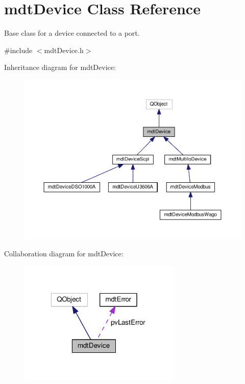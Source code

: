\hypertarget{classmdt_device}{\section{mdt\-Device Class Reference}
\label{classmdt_device}
}


Base class for a device connected to a port.  




{\ttfamily \#include $<$mdt\-Device.\-h$>$}



Inheritance diagram for mdt\-Device\-:\nopagebreak
\begin{figure}[H]
\begin{center}
\leavevmode
\includegraphics[width=350pt]{classmdt_device__inherit__graph}
\end{center}
\end{figure}


Collaboration diagram for mdt\-Device\-:\nopagebreak
\begin{figure}[H]
\begin{center}
\leavevmode
\includegraphics[width=218pt]{classmdt_device__coll__graph}
\end{center}
\end{figure}
